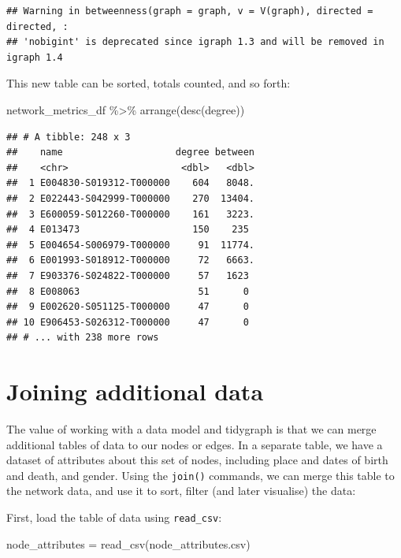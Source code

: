 \documentclass[
]{book}
\newenvironment{Shaded}{\begin{snugshade}}{\end{snugshade}}
\newcommand{\FunctionTok}[1]{\textcolor[rgb]{0.00,0.00,0.00}{#1}}
\newcommand{\NormalTok}[1]{#1}
\newcommand{\OtherTok}[1]{\textcolor[rgb]{0.56,0.35,0.01}{#1}}
\newcommand{\SpecialCharTok}[1]{\textcolor[rgb]{0.00,0.00,0.00}{#1}}
\newcommand{\StringTok}[1]{\textcolor[rgb]{0.31,0.60,0.02}{#1}}
\begin{document}
\begin{verbatim}
## Warning in betweenness(graph = graph, v = V(graph), directed = directed, :
## 'nobigint' is deprecated since igraph 1.3 and will be removed in igraph 1.4
\end{verbatim}

This new table can be sorted, totals counted, and so forth:

\begin{Shaded}
\begin{Highlighting}[]
\NormalTok{network\_metrics\_df }\SpecialCharTok{\%\textgreater{}\%} \FunctionTok{arrange}\NormalTok{(}\FunctionTok{desc}\NormalTok{(degree))}
\end{Highlighting}
\end{Shaded}

\begin{verbatim}
## # A tibble: 248 x 3
##    name                    degree between
##    <chr>                    <dbl>   <dbl>
##  1 E004830-S019312-T000000    604   8048.
##  2 E022443-S042999-T000000    270  13404.
##  3 E600059-S012260-T000000    161   3223.
##  4 E013473                    150    235 
##  5 E004654-S006979-T000000     91  11774.
##  6 E001993-S018912-T000000     72   6663.
##  7 E903376-S024822-T000000     57   1623 
##  8 E008063                     51      0 
##  9 E002620-S051125-T000000     47      0 
## 10 E906453-S026312-T000000     47      0 
## # ... with 238 more rows
\end{verbatim}

\hypertarget{joining-additional-data}{%
\section{Joining additional data}\label{joining-additional-data}}

The value of working with a data model and tidygraph is that we can merge additional tables of data to our nodes or edges. In a separate table, we have a dataset of attributes about this set of nodes, including place and dates of birth and death, and gender. Using the \texttt{join()} commands, we can merge this table to the network data, and use it to sort, filter (and later visualise) the data:

First, load the table of data using \texttt{read\_csv}:

\begin{Shaded}
\begin{Highlighting}[]
\NormalTok{node\_attributes }\OtherTok{=} \FunctionTok{read\_csv}\NormalTok{(}\StringTok{\textquotesingle{}node\_attributes.csv\textquotesingle{}}\NormalTok{)}
\end{Highlighting}
\end{Shaded}
\end{document}

